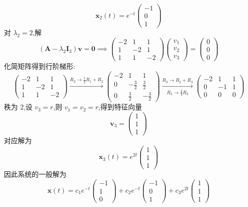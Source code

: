 \begin{questions}
\begin{solution}
\[        \boldsymbol{x}_2(t) = e^{-t} \begin{pmatrix}-1\\0\\1\end{pmatrix}
        \]
        对 $\lambda_2 = 2$,解
        \[
        (\boldsymbol{A} - \lambda_2 \boldsymbol{I}_3) \boldsymbol{v} = \boldsymbol{0} \implies 
        \begin{pmatrix}-2 & 1 & 1 \\ 1 & -2 & 1 \\ 1 & 1 & -2\end{pmatrix} \begin{pmatrix}v_1\\v_2\\v_3\end{pmatrix} = \begin{pmatrix}0\\0\\0\end{pmatrix}
        \]
        化简矩阵得到行阶梯形:
        \[
        \begin{pmatrix} -2 & 1 & 1 \\ 1 & -2 & 1 \\ 1 & 1 & -2 \end{pmatrix}
        \xrightarrow{R_2 \to \frac{1}{2}R_1 + R_2}
        \begin{pmatrix} -2 & 1 & 1 \\ 0 & -\frac{3}{2} & \frac{3}{2} \\ 0 & \frac{3}{2} & -\frac{3}{2} \end{pmatrix}
        \xrightarrow[R_3 \to \frac{2}{3}R_3]{R_3 \to R_2 + R_3}
        \begin{pmatrix}-2 & 1 & 1 \\ 0 & -1 & 1 \\ 0 & 0 & 0\end{pmatrix}
        \]
        秩为 2,设 $v_3 = r$,则 $v_1 = v_2 = r$,得到特征向量
        \[
        \boldsymbol{v}_3 = \begin{pmatrix}1\\1\\1\end{pmatrix}
        \]
        对应解为
        \[
        \boldsymbol{x}_3(t) = e^{2t} \begin{pmatrix}1\\1\\1\end{pmatrix}
        \]
        因此系统的一般解为
        \[
        \boldsymbol{x}(t) = c_1 e^{-t} \begin{pmatrix}-1\\1\\0\end{pmatrix} 
        + c_2 e^{-t} \begin{pmatrix}-1\\0\\1\end{pmatrix} 
        + c_3 e^{2t} \begin{pmatrix}1\\1\\1\end{pmatrix}
        \]
    \end{solution}


\end{questions}
